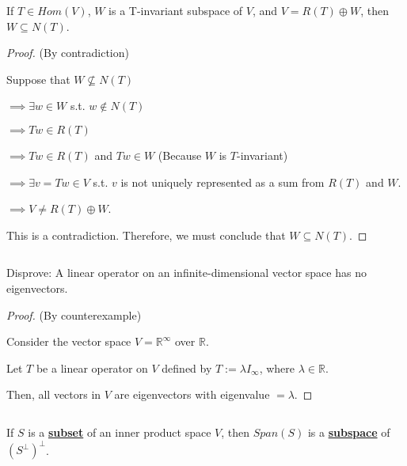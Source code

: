 \documentclass{article}
\newenvironment{customthm}[1]
  {\renewcommand\theinnercustomthm{#1}\innercustomthm}
  {\endinnercustomthm}
\begin{document}
\begin{customthm}{3}[2023.S(1.A.iii)]
  $ $

  If $T \in Hom(V)$, $W$ is a T-invariant subspace of $V$, and $V = R(T) \oplus W$, then $W \subseteq N(T)$. 

\end{customthm}
\begin{proof}{(By contradiction)}
  $ $

  Suppose that $W \not\subseteq N(T)$
  
  \noindent
  $\implies \exists w \in W$ s.t. $w \notin N(T)$

  \noindent
  $\implies Tw \in R(T)$

  \noindent
  $\implies Tw \in R(T)$ and $Tw \in W$ \quad (Because $W$ is $T$-invariant)

  \noindent
  $\implies \exists v=Tw \in V$ s.t. $v$ is not uniquely represented as a sum from $R(T)$ and $W$.

  \noindent
  $\implies V \neq R(T) \oplus W$.
  \newline

  \noindent
  This is a contradiction. Therefore, we must conclude that $W \subseteq N(T)$.

\end{proof}
\newpage

\begin{customthm}{4}[2023.S(1.A.iv)]
  $ $

  Disprove: A linear operator on an infinite-dimensional vector space has no eigenvectors. 

\end{customthm}

\begin{proof}{(By counterexample)}
  $ $

  Consider the vector space $V = \mathbb{R}^\infty$ over $\mathbb{R}$.

  Let $T$ be a linear operator on $V$ defined by $T := \lambda I_\infty$, where $\lambda \in \mathbb{R}$.

  Then, all vectors in $V$ are eigenvectors with eigenvalue $= \lambda$.

  
\end{proof}
\newpage

\begin{customthm}{5}[2023.S(1.A.v)]
  $ $

  If $S$ is a \textbf{\underline{subset}} of an inner product space $V$, then $Span(S)$ is a \textbf{\underline{subspace}} of $(S^\perp)^\perp$.

\end{customthm}
\end{document}
